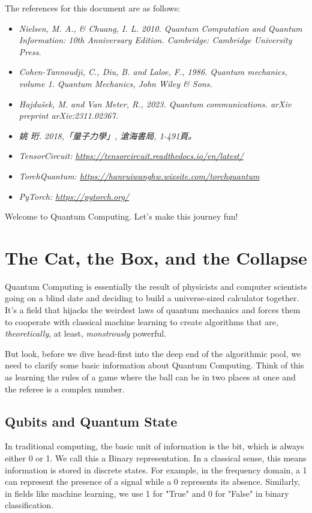 \documentclass[11pt, letterpaper]{article}
\begin{document}
The references for this document are as follows:
\begin{referencebox}[Reference]
  \begin{itemize}
    \item \textit{Nielsen, M. A., \& Chuang, I. L. 2010. Quantum Computation and Quantum Information: 10th Anniversary Edition. Cambridge: Cambridge University Press.}
    \item \textit{Cohen-Tannoudji, C., Diu, B. and Laloe, F., 1986. Quantum mechanics, volume 1. Quantum Mechanics, John Wiley \& Sons.}
    \item \textit{Hajdušek, M. and Van Meter, R., 2023. Quantum communications. arXiv preprint arXiv:2311.02367.}
    \item \textit{姚 珩. 2018,「量子力學」, 滄海書局, 1-491頁。}
    \item \textit{TensorCircuit: \href{https://tensorcircuit.readthedocs.io/en/latest/}{https://tensorcircuit.readthedocs.io/en/latest/}}
    \item \textit{TorchQuantum: \href{https://hanruiwanghw.wixsite.com/torchquantum}{https://hanruiwanghw.wixsite.com/torchquantum}}
    \item \textit{PyTorch: \href{https://pytorch.org/}{https://pytorch.org/}}
  \end{itemize}
\end{referencebox}

Welcome to Quantum Computing. Let's make this journey fun!

\newpage
\section{The Cat, the Box, and the Collapse}
\label{basicinformation}
Quantum Computing is essentially the result of physicists and computer scientists going on a blind date and deciding to build a universe-sized calculator together. It's a field that hijacks the weirdest laws of quantum mechanics and forces them to cooperate with classical machine learning to create algorithms that are, \textit{theoretically}, at least, \textit{monstrously} powerful. 

But look, before we dive head-first into the deep end of the algorithmic pool, we need to clarify some basic information about Quantum Computing. Think of this as learning the rules of a game where the ball can be in two places at once and the referee is a complex number.

\subsection{Qubits and Quantum State}
In traditional computing, the basic unit of information is the bit, which is always either 0 or 1. We call this a Binary representation. In a classical sense, this means information is stored in discrete states. For example, in the frequency domain, a 1 can represent the presence of a signal while a 0 represents its absence. Similarly, in fields like machine learning, we use 1 for "True" and 0 for "False" in binary classification.
\end{document}
